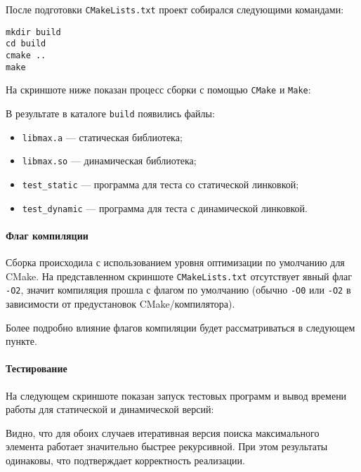 \vspace{0.5em}
После подготовки \texttt{CMakeLists.txt} проект собирался следующими командами:
\begin{lstlisting}
mkdir build
cd build
cmake ..
make
\end{lstlisting}
На скриншоте ниже показан процесс сборки с помощью \texttt{CMake} и \texttt{Make}:


\vspace{0.5em}
В результате в каталоге \texttt{build} появились файлы:
\begin{itemize}
\item \texttt{libmax.a} — статическая библиотека;
\item \texttt{libmax.so} — динамическая библиотека;
\item \texttt{test\_static} — программа для теста со статической линковкой;
\item \texttt{test\_dynamic} — программа для теста с динамической линковкой.
\end{itemize}

\paragraph{Флаг компиляции}
Сборка происходила с использованием уровня оптимизации по умолчанию для CMake. На представленном скриншоте \texttt{CMakeLists.txt} отсутствует явный флаг \texttt{-O2}, значит компиляция прошла с флагом по умолчанию (обычно \texttt{-O0} или \texttt{-O2} в зависимости от предустановок CMake/компилятора).

Более подробно влияние флагов компиляции будет рассматриваться в следующем пункте.

\vspace{0.5em}
\paragraph{Тестирование}
На следующем скриншоте показан запуск тестовых программ и вывод времени работы для статической и динамической версий:


Видно, что для обоих случаев итеративная версия поиска максимального элемента работает значительно быстрее рекурсивной. При этом результаты одинаковы, что подтверждает корректность реализации.

